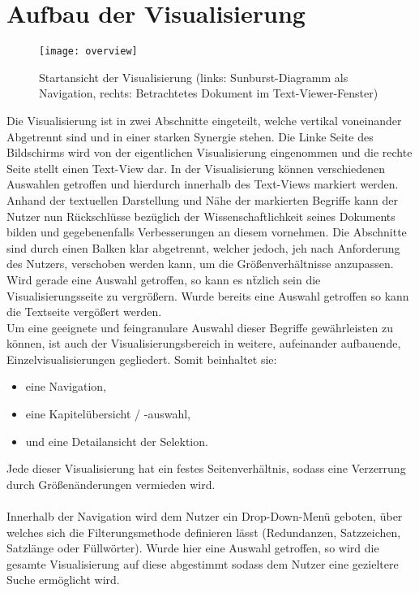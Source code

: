 \section{Aufbau der Visualisierung}
\begin{figure}[!htbp]
 \centering
 \texttt{[image: overview]}
 \caption{Startansicht der Visualisierung (links: Sunburst-Diagramm als Navigation, rechts: Betrachtetes Dokument im Text-Viewer-Fenster)}
 \label{fig:sunburst}
\end{figure}
Die Visualisierung ist in zwei Abschnitte eingeteilt, welche vertikal voneinander Abgetrennt sind und in einer starken Synergie stehen. Die Linke Seite des Bildschirms wird von der eigentlichen Visualisierung eingenommen und die rechte Seite stellt einen Text-View dar. In der Visualisierung k\"onnen verschiedenen Auswahlen getroffen und hierdurch innerhalb des Text-Views markiert werden. Anhand der textuellen Darstellung und N\"ahe der markierten Begriffe kann der Nutzer nun R\"uckschl\"usse bez\"uglich der Wissenschaftlichkeit seines Dokuments bilden und gegebenenfalls Verbesserungen an diesem vornehmen. Die Abschnitte sind durch einen Balken klar abgetrennt, welcher jedoch, jeh nach Anforderung des Nutzers, verschoben werden kann, um die Gr\"o{\ss}enverh\"altnisse anzupassen. Wird gerade eine Auswahl getroffen, so kann es n\"tzlich sein die Visualisierungsseite zu vergr\"o{\ss}ern. Wurde bereits eine Auswahl getroffen so kann die Textseite verg\"o{\ss}ert werden.\\
Um eine geeignete und feingranulare Auswahl dieser Begriffe gew\"ahrleisten zu k\"onnen, ist auch der Visualisierungsbereich in weitere, aufeinander aufbauende, Einzelvisualisierungen gegliedert. Somit beinhaltet sie:
\begin{center} 
   \begin{varwidth}{2in} 
      \begin{itemize} 
         \item eine Navigation,
		 \item eine Kapitel\"ubersicht / -auswahl,
		 \item und eine Detailansicht der Selektion. 
      \end{itemize} 
   \end{varwidth} 
\end{center} 
Jede dieser Visualisierung hat ein festes Seitenverh\"altnis, sodass eine Verzerrung durch Gr\"o{\ss}en\"anderungen vermieden wird.\\
\\
Innerhalb der Navigation wird dem Nutzer ein Drop-Down-Men\"u geboten, \"uber welches sich die Filterungsmethode definieren l\"asst (Redundanzen, Satzzeichen, Satzl\"ange oder F\"ullw\"orter). Wurde hier eine Auswahl getroffen, so wird die gesamte Visualisierung auf diese abgestimmt sodass dem Nutzer eine gezieltere Suche erm\"oglicht wird.\\

